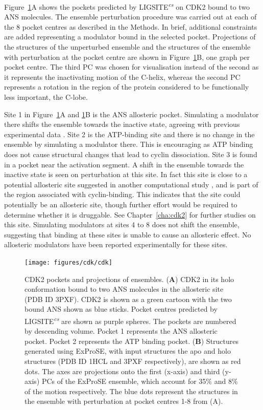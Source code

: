 Figure~\ref{fig:cdk}A shows the pockets predicted by LIGSITE\textsuperscript{\it cs} \cite{Huang2006} on CDK2 bound to two ANS molecules.
The ensemble perturbation procedure was carried out at each of the 8 pocket centres as described in the Methods.
In brief, additional constraints are added representing a modulator bound in the selected pocket.
Projections of the structures of the unperturbed ensemble and the structures of the ensemble with perturbation at the pocket centre are shown in Figure~\ref{fig:cdk}B, one graph per pocket centre.
The third PC was chosen for visualisation instead of the second as it represents the inactivating motion of the C-helix, whereas the second PC represents a rotation in the region of the protein considered to be functionally less important, the C-lobe.

Site 1 in Figure~\ref{fig:cdk}A and \ref{fig:cdk}B is the ANS allosteric pocket.
Simulating a modulator there shifts the ensemble towards the inactive state, agreeing with previous experimental data \cite{Betzi2011}.
Site 2 is the ATP-binding site and there is no change in the ensemble by simulating a modulator there.
This is encouraging as ATP binding does not cause structural changes that lead to cyclin dissociation.
Site 3 is found in a pocket near the activation segment.
A shift in the ensemble towards the inactive state is seen on perturbation at this site.
In fact this site is close to a potential allosteric site suggested in another computational study \cite{Pitt2014}, and is part of the region associated with cyclin-binding.
This indicates that the site could potentially be an allosteric site, though further effort would be required to determine whether it is druggable.
See Chapter~\ref{cha:cdk2} for further studies on this site.
Simulating modulators at sites 4 to 8 does not shift the ensemble, suggesting that binding at these sites is unable to cause an allosteric effect.
No allosteric modulators have been reported experimentally for these sites.


\begin{figure}
\centering

\texttt{[image: figures/cdk/cdk]}

\caption{CDK2 pockets and projections of ensembles.
(\textbf{A}) CDK2 in its holo conformation bound to two ANS molecules in the allosteric site (PDB ID 3PXF).
CDK2 is shown as a green cartoon with the two bound ANS shown as blue sticks.
Pocket centres predicted by LIGSITE\textsuperscript{\it cs} are shown as purple spheres.
The pockets are numbered by descending volume.
Pocket 1 represents the ANS allosteric pocket.
Pocket 2 represents the ATP binding pocket.
(\textbf{B}) Structures generated using ExProSE, with input structures the apo and holo structures (PDB ID 1HCL and 3PXF respectively), are shown as red dots.
The axes are projections onto the first (x-axis) and third (y-axis) PCs of the ExProSE ensemble, which account for 35\% and 8\% of the motion respectively.
The blue dots represent the structures in the ensemble with perturbation at pocket centres 1-8 from (A).}

\label{fig:cdk}
\end{figure}


